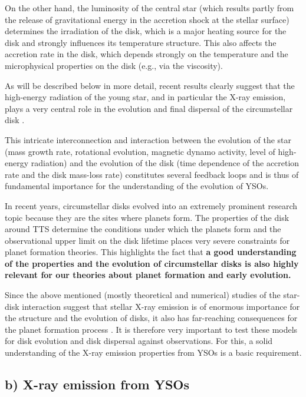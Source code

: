 \documentclass[10pt,fleqn,twoside]{article}
\newcommand{\Tcol}{\color{blue}}
\begin{document}
On the other hand, the
 luminosity of the central star (which results 
partly from the
release of gravitational energy in the accretion shock at the stellar surface) 
determines the irradiation of the disk,
which is a major heating source for the disk and strongly
influences its temperature structure. This also affects the accretion rate in the
disk, which depends strongly on the
 temperature and the
microphysical properties on the disk (e.g., via the viscosity).


As will be described below in more detail, recent results clearly suggest that the
high-energy radiation of the young star, and in particular the X-ray emission,
 plays a very central role in the evolution
and final dispersal of the circumstellar disk
\citep{Ercolano08a,Ercolano08b,Ercolano09,Owen10,Owen11,Owen12}.



%
This intricate interconnection and interaction between the evolution of the star 
(mass growth rate, rotational evolution, magnetic dynamo activity, level
of high-energy radiation)
and the evolution of the disk (time dependence of the accretion rate
and the disk mass-loss rate)
constitutes several feedback loops and is thus 
of fundamental importance for the understanding of the
evolution of YSOs.


\medskip

In recent years,
circumstellar disks evolved into an extremely prominent research topic 
because they are the sites where planets form. 
The properties of the disk around TTS determine the conditions 
under which the planets form and the observational upper limit on the
disk lifetime places very severe constraints for planet formation 
theories.
This highlights the fact that
\textbf{a good understanding of the properties and the evolution of circumstellar disks is also 
highly relevant for our theories about planet formation and early evolution.}


Since the above mentioned (mostly theoretical and numerical) studies
of the star-disk interaction
suggest that stellar X-ray emission is of enormous 
importance for the structure and the evolution of disks, it also
has far-reaching consequences for the planet formation process
\citep{ER15,2013MNRAS.430.1392R, Rosotti15}.
%
It is therefore very important to test these models for disk evolution and disk dispersal
against observations.
For this, a solid understanding of the X-ray
emission properties from YSOs is a basic requirement.


\subsection*{\Tcol b) X-ray emission from YSOs}
\end{document}

